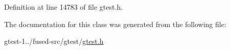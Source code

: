 \-Definition at line 14783 of file gtest.\-h.



\-The documentation for this class was generated from the following file\-:\begin{DoxyCompactItemize}
\item 
gtest-\/1../fused-\/src/gtest/\hyperlink{fused-src_2gtest_2gtest_8h}{gtest.\-h}\end{DoxyCompactItemize}
